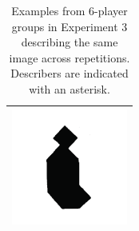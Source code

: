 \documentclass[
  english,
]{article}
\begin{document}
\begin{table}
    \centering

    \caption{Examples from 6-player groups in Experiment 3 describing the same image across repetitions. Describers are indicated with an asterisk.\\\label{listener-examples}}
    \begin{subtable}{0.5\linewidth}
        \centering
            \begin{tabular}{lp{2.5in}}
                        \multicolumn{2}{c}{\includegraphics[width=1.5in]{images/tangram_H.png}}\\
            \hline
            

\end{tabular}
\end{subtable}
\end{table}
\end{document}
